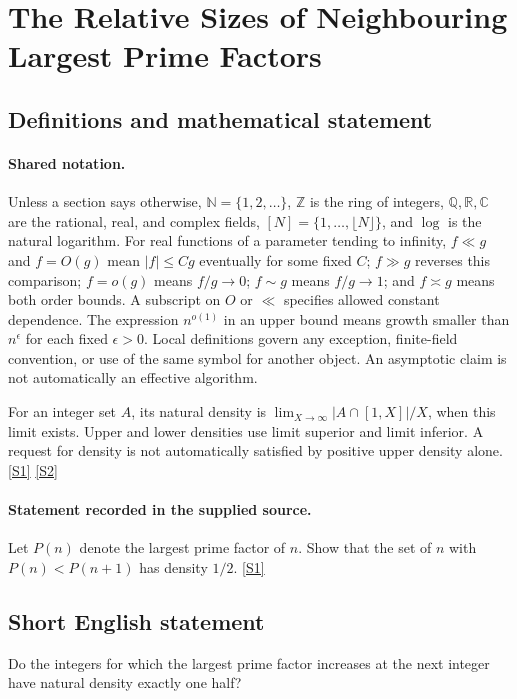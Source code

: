 \documentclass[11pt,a4paper]{article}
\newcommand{\N}{\mathbb{N}}
\newcommand{\Z}{\mathbb{Z}}
\newcommand{\Q}{\mathbb{Q}}
\newcommand{\R}{\mathbb{R}}
\newcommand{\C}{\mathbb{C}}
\newcommand{\sref}[2]{\hyperlink{source:#1:#2}{[S#2]}}
\begin{document}
\section{The Relative Sizes of Neighbouring Largest Prime Factors}\label{statement}


\subsection{Definitions and mathematical statement}

\paragraph{Shared notation.}Unless a section says otherwise, $\N=\{1,2,\ldots\}$,
$\Z$ is the ring of integers, $\Q,\R,\C$ are the rational, real, and complex
fields, $[N]=\{1,\ldots,\lfloor N\rfloor\}$, and $\log$ is the natural
logarithm. For real functions of a parameter tending to infinity,
$f\ll g$ and $f=O(g)$ mean $|f|\leq Cg$ eventually for some fixed $C$;
$f\gg g$ reverses this comparison; $f=o(g)$ means $f/g\to0$;
$f\sim g$ means $f/g\to1$; and $f\asymp g$ means both order bounds.
A subscript on $O$ or $\ll$ specifies allowed constant dependence.
The expression $n^{o(1)}$ in an upper bound means growth smaller than
$n^\epsilon$ for each fixed $\epsilon>0$. Local definitions govern any
exception, finite-field convention, or use of the same symbol for another
object. An asymptotic claim is not automatically an effective algorithm.



For an integer set $A$, its natural density is $\lim_{X\to\infty}|A\cap[1,X]|/X$, when this limit exists. Upper and lower densities use limit superior and limit inferior. A request for density is not automatically satisfied by positive upper density alone. \sref{statement}{1} \sref{statement}{2}

\paragraph{Statement recorded in the supplied source.}
Let $P(n)$ denote the largest prime factor of $n$. Show that the set of $n$ with $P(n)<P(n+1)$ has density $1/2$. \sref{statement}{1}

\subsection{Short English statement}

Do the integers for which the largest prime factor increases at the next integer have natural density exactly one half?
\end{document}
